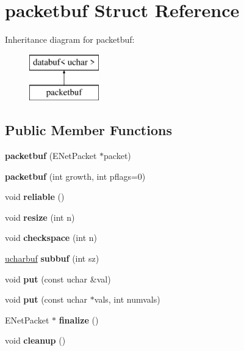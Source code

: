\hypertarget{structpacketbuf}{}\section{packetbuf Struct Reference}
\label{structpacketbuf}
Inheritance diagram for packetbuf\+:\begin{figure}[H]
\begin{center}
\leavevmode
\includegraphics[height=2.000000cm]{structpacketbuf}
\end{center}
\end{figure}
\subsection*{Public Member Functions}
\begin{DoxyCompactItemize}
\item 
\mbox{\label{structpacketbuf_a2c841788bf1ee3606f8d6d7b436263b4}} 
{\bfseries packetbuf} (E\+Net\+Packet $\ast$packet)
\item 
\mbox{\label{structpacketbuf_a06d2f15bd850d74205d891580cd722e1}} 
{\bfseries packetbuf} (int growth, int pflags=0)
\item 
\mbox{\label{structpacketbuf_ad054468cede59dc89af61ac4c467441d}} 
void {\bfseries reliable} ()
\item 
\mbox{\label{structpacketbuf_ae1ab4ee20a5de67d0c276a2d57945d8c}} 
void {\bfseries resize} (int n)
\item 
\mbox{\label{structpacketbuf_a688f6a9046190b384f3d097a86563906}} 
void {\bfseries checkspace} (int n)
\item 
\mbox{\label{structpacketbuf_aa4b95be7adb8a21b5b173fdc57634dd8}} 
\hyperlink{structdatabuf}{ucharbuf} {\bfseries subbuf} (int sz)
\item 
\mbox{\label{structpacketbuf_a3be02b0d4a7c471dbd138f3c747b4145}} 
void {\bfseries put} (const uchar \&val)
\item 
\mbox{\label{structpacketbuf_ac98633a87a4d61be96005231fbe65625}} 
void {\bfseries put} (const uchar $\ast$vals, int numvals)
\item 
\mbox{\label{structpacketbuf_a6d6174c09b98de2938aa193d02a65cc8}} 
E\+Net\+Packet $\ast$ {\bfseries finalize} ()
\item 
\mbox{\label{structpacketbuf_a87284813ecd9479c467b1bf7e1e9754c}} 
void {\bfseries cleanup} ()
\end{DoxyCompactItemize}
